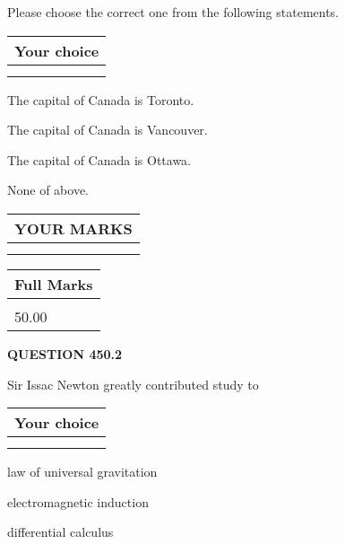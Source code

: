 \documentclass[12pt]{article}
\begin{document}
  
Please choose the correct one from the following statements.
  
  
\noindent\hspace{3.0in} \begin{tabular}{|l|}
\hline
Your choice \\
\hline
 \\ 
 \\ 
\hline
\end{tabular}
  
  
 
 
The capital of Canada is Toronto.
 
 
The capital of Canada is Vancouver.
 
 
The capital of Canada is Ottawa.
 
 
 None of above.
 
 
  
\vspace{0.2in}
  
\noindent\begin{tabular}{|l|}
\hline
 YOUR MARKS  \\
\hline
 \\ 
 \\ 
\hline
\end{tabular}
\hspace{0.05in} \begin{tabular}{|l|}
\hline
 Full Marks  \\
\hline
 \\ 
50.00 \\
\hline
\end{tabular}
{\textbf{\Large{QUESTION
450.2 
}}}
  
  
Sir Issac Newton greatly contributed study to
  
  
\noindent\hspace{3.0in} \begin{tabular}{|l|}
\hline
Your choice \\
\hline
 \\ 
 \\ 
\hline
\end{tabular}
  
  
 
 
law of universal gravitation
 
 
electromagnetic induction
 
 
differential calculus
 
\end{document}

